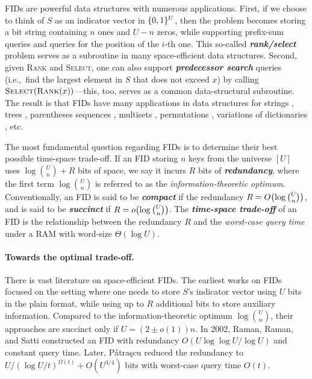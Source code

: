 \documentclass{article}
\theoremstyle{plain}
\theoremstyle{definition}  \newtheorem{definition}[theorem]{Definition}
\DeclarePairedDelimiter{\bk}{(}{)}
\DeclarePairedDelimiter{\BK}{\{}{\}}
\newcommand{\Patrascu}{\textup{P{\v{a}}tra{\c{s}}cu}\xspace}
\newcommand{\rank}{\textup{\textsc{Rank}}\xspace}
\newcommand{\select}{\textup{\textsc{Select}}\xspace}
\newcommand{\defn}[1]{\emph{\textbf{#1}}}
\begin{document}
FIDs are powerful data structures with numerous applications. First, if we choose to think of $S$ as an indicator vector in $\BK{0, 1}^{U}$, then the problem becomes storing a bit string containing $n$ ones and $U - n$ zeros, while supporting prefix-sum queries and queries for the position of the $i$-th one. This so-called \defn{rank/select} problem serves as a subroutine in many space-efficient data structures. Second, given \rank and \select, one can also support \defn{predecessor search} queries (i.e.,~find the largest element in $S$ that does not exceed $x$) by calling $\select(\rank(x))$---this, too, serves as a common data-structural subroutine. The result is that FIDs have many applications in data structures for strings \cite{clark1996efficient, ferragina2005indexing, grossi2005compressed, hon2009breaking, munro2001space, navarro2007compressed, grossi2003highorder, ferragina2008searching}, trees \cite{ferragina2005structuring, geary2006succinct, raman2007succinct, munro2001succinct}, parentheses sequences \cite{geary2006simple, munro2001succinct}, multisets \cite{raman2007succinct}, permutations \cite{munro2012succinct}, variations of dictionaries \cite{buhrman2002are, blandford2008compact}, etc.

The most fundamental question regarding FIDs is to determine their best possible time-space trade-off. If an FID storing $n$ keys from the universe $[U]$ uses $\log \binom{U}{n} + R$ bits of space, we say it incurs $R$ bits of \defn{redundancy}, where the first term $\log \binom{U}{n}$ is referred to as the \emph{information-theoretic optimum}.
Conventionally, an FID is said to be \defn{compact} if the redundancy $R = O\bk[\big]{\log \binom{U}{n}}$, and is said to be \defn{succinct} if $R = o\bk[\big]{\log \binom{U}{n}}$.
The \defn{time-space trade-off} of an FID is the relationship between the redundancy $R$ and the \emph{worst-case query time} under a RAM with word-size $\Theta(\log U)$.

\paragraph{Towards the optimal trade-off.}

There is vast literature on space-efficient FIDs. The earliest works \cite{jacobson1988succinct,munro1996tables,clark1996compact} on FIDs focused on the setting where one needs to store $S$'s indicator vector using $U$ bits in the plain format, while using up to $R$ additional bits to store auxiliary information. Compared to the information-theoretic optimum $\log \binom{U}{n}$, their approaches are succinct only if $U = (2 \pm o(1)) n$.
In 2002, Raman, Raman, and Satti \cite{raman2007succinct} constructed an FID with redundancy $O(U \log \log U / \log U)$ and constant query time. Later, \Patrascu \cite{patrascu2008succincter} reduced the redundancy to $U / (\log U / t)^{\Omega(t)}+ O(U^{3/4})$ bits with worst-case query time $O(t)$.
\end{document}
